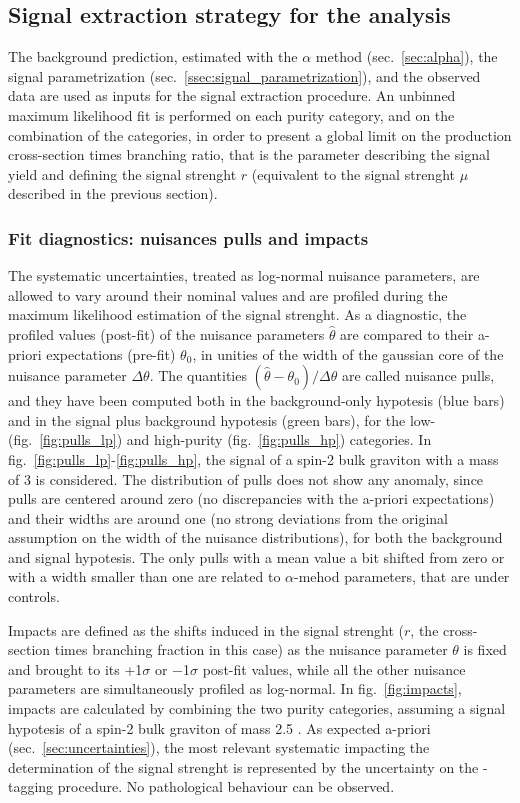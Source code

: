 \subsection{Signal extraction strategy for the analysis}

The background prediction, estimated with the $\alpha$ method (sec.~\ref{sec:alpha}), the signal parametrization (sec.~\ref{ssec:signal_parametrization}), and the observed data are used as inputs for the signal extraction procedure. An unbinned maximum likelihood fit is performed on each purity category, and on the combination of the categories, in order to present a global limit on the production cross-section times branching ratio, that is the parameter describing the signal yield and defining the signal strenght $r$ (equivalent to the signal strenght $\mu$ described in the previous section).

\subsubsection{Fit diagnostics: nuisances pulls and impacts}

The systematic uncertainties, treated as log-normal nuisance parameters, are allowed to vary around their nominal values and are profiled during the maximum likelihood estimation of the signal strenght. As a diagnostic, the profiled values (post-fit) of the nuisance parameters $\hat{\theta}$ are compared to their a-priori expectations (pre-fit) $\theta_0$, in unities of the width of the gaussian core of the nuisance parameter $\Delta \theta$. The quantities $(\hat{\theta} - \theta_0) / \Delta \theta$ are called nuisance pulls, and they have been computed both in the background-only hypotesis (blue bars) and in the signal plus background hypotesis (green bars), for the low- (fig.~\ref{fig:pulls_lp}) and high-purity (fig.~\ref{fig:pulls_hp}) categories. In fig.~\ref{fig:pulls_lp}-\ref{fig:pulls_hp}, the signal of a spin-2 bulk graviton with a mass of 3 \TeV is considered. The distribution of pulls does not show any anomaly, since pulls are centered around zero (no discrepancies with the a-priori expectations) and their widths are around one (no strong deviations from the original assumption on the width of the nuisance distributions), for both the background and signal hypotesis. The only pulls with a mean value a bit shifted from zero or with a width smaller than one are related to $\alpha$-mehod parameters, that are under controls.

\noindent Impacts are defined as the shifts induced in the signal strenght ($r$, the cross-section times branching fraction in this case) as the nuisance parameter $\theta$ is fixed and brought to its +1$\sigma$ or −1$\sigma$ post-fit values, while all the other nuisance parameters are simultaneously profiled as log-normal. In fig.~\ref{fig:impacts}, impacts are calculated by combining the two purity categories, assuming a signal hypotesis of a spin-2 bulk graviton of mass 2.5 \TeV. As expected a-priori (sec.~\ref{sec:uncertainties}), the most relevant systematic impacting the determination of the signal strenght is represented by the uncertainty on the \V-tagging procedure. No pathological behaviour can be observed. %


